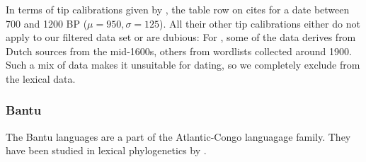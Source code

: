 \documentclass[a4paper,12pt]{scrartcl}
\begin{document}
In terms of tip calibrations given by \textcite{gray2009language}, the table row on  cites \textcite{zoetmulder1982old} for a date between 700 and 1200 BP ($\mu=950, \sigma=125$).
All their other tip calibrations either do not apply to our filtered data set or are dubious:
For , some of the data derives from Dutch sources from the mid-1600s, others from wordlists collected around 1900. Such a mix of data makes it unsuitable for dating, so we completely exclude  from the lexical data.

\subsubsection{Bantu}
The Bantu languages are a part of the Atlantic-Congo languagage family. They
have been studied in lexical phylogenetics by
\textcite{grollemund2015bantu,greenhill2018population,currie2013cultural}.
\end{document}
